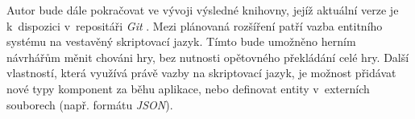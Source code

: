 Autor bude dále pokračovat ve vývoji výsledné knihovny, jejíž aktuální verze je k~dispozici v~repositáři \emph{Git} \cite{EntropyGit}. Mezi plánovaná rozšíření patří vazba entitního systému na vestavěný skriptovací jazyk. Tímto bude umožněno herním návrhářům měnit chováni hry, bez nutnosti opětovného překládání celé hry. Další vlastností, která využívá právě vazby na skriptovací jazyk, je možnost přidávat nové typy komponent za běhu aplikace, nebo definovat entity v~externích souborech (např. formátu \emph{JSON}). 


